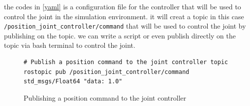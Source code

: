 \documentclass[../../main]{subfiles}
\begin{document}
  the codes in \cref{yaml} is a configuration file for the controller that will be used to control the joint in the simulation environment.
  it will creat a topic in this case\\ \texttt{/position\_joint\_controller/command} that will be used to control the joint by publishing on the topic.
  we can write a script or even publish directly on the topic via bash terminal to control the joint.
  \begin{figure}
    \centering
    \begin{verbatim}
# Publish a position command to the joint controller topic
rostopic pub /position_joint_controller/command std_msgs/Float64 "data: 1.0"
    \end{verbatim}
    \caption{Publishing a position command to the joint controller}
  \end{figure}
\end{document}

